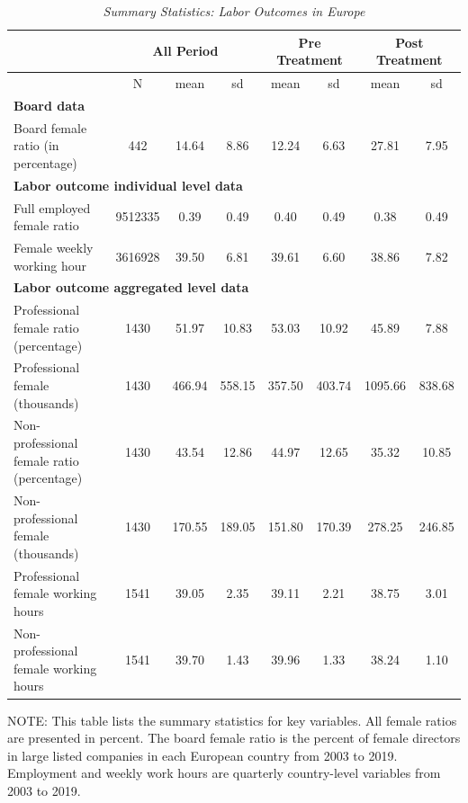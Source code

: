\begin{table}[H]
\centering
\renewcommand{\arraystretch}{1.2}
\caption{\emph{Summary Statistics: Labor Outcomes in Europe}}\label{table1}
\begin{tabular}{l*{7}{c}} 
\hline
\hline
&\multicolumn{3}{c}{All Period}&\multicolumn{2}{c}{Pre Treatment}&\multicolumn{2}{c}{Post Treatment}\\
\hline
&\multicolumn{1}{c}{N}&\multicolumn{1}{c}{mean}&\multicolumn{1}{c}{sd}&\multicolumn{1}{c}{mean}&\multicolumn{1}{c}{sd}&\multicolumn{1}{c}{mean}&\multicolumn{1}{c}{sd}\\
\hline
\multicolumn{8}{l}{\textbf{Board data}}\\
Board female ratio (in percentage) & 442 &     14.64 &      8.86 &     12.24 &      6.63 &     27.81 &      7.95\\
\hline
\multicolumn{8}{l}{\textbf{Labor outcome individual level data}}\\
Full employed female ratio & 9512335 &      0.39 &      0.49 &      0.40 &      0.49 &      0.38 &      0.49\\
Female weekly working hour & 3616928 &     39.50 &      6.81 &     39.61 &      6.60 &     38.86 &      7.82\\
\hline
\multicolumn{8}{l}{\textbf{Labor outcome aggregated level data}}\\
Professional female ratio (percentage) & 1430 &     51.97 &     10.83 &     53.03 &     10.92 &     45.89 &      7.88\\
Professional female (thousands) & 1430 &    466.94 &    558.15 &    357.50 &    403.74 &   1095.66 &    838.68\\
Non-professional female ratio (percentage) & 1430 &     43.54 &     12.86 &     44.97 &     12.65 &     35.32 &     10.85\\
Non-professional female (thousands) & 1430 &    170.55 &    189.05 &    151.80 &    170.39 &    278.25 &    246.85\\
Professional female working hours & 1541 &     39.05 &      2.35 &     39.11 &      2.21 &     38.75 &      3.01\\
Non-professional female working hours & 1541 &     39.70 &      1.43 &     39.96 &      1.33 &     38.24 &      1.10\\
\hline
\end{tabular}
\begin{tablenotes}\footnotesize
\item NOTE: This table lists the summary statistics for key variables. All female ratios are presented in percent. The board female ratio is the percent of female directors in large listed companies in each European country from 2003 to 2019. Employment and weekly work hours are quarterly country-level variables from 2003 to 2019. 
\end{tablenotes}
\end{table}
